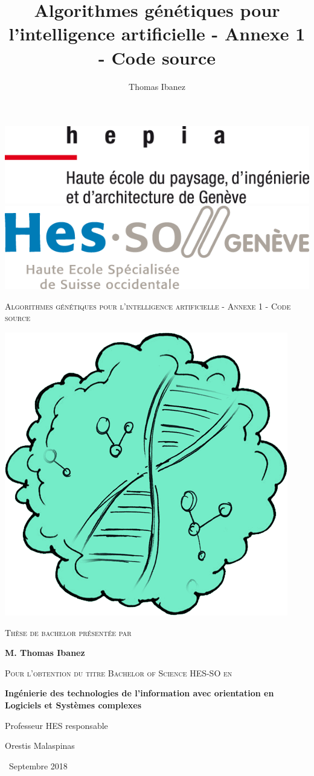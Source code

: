 \documentclass{article}
\title{Algorithmes génétiques pour l'intelligence artificielle - Annexe 1 - Code source}
\author{Thomas Ibanez}
\begin{document}
\begin{titlepage}
	\vspace*{-3cm}
		\includegraphics[width=.3\linewidth]{hepia.png}
		\hfill
		\includegraphics[width=.3\linewidth]{hes.png}\par
	\vspace{1cm}
	\centering
	{\scshape\huge Algorithmes génétiques pour l'intelligence artificielle - Annexe 1 - Code source \par}
	\vspace{1cm}
	\includegraphics[scale=0.4]{logo.png}\par
	\vspace{1.5cm}
	{\Large\scshape Thèse de bachelor présentée par\par}
	\vspace{0.5cm}
	{\bfseries\Large M. Thomas Ibanez\par}
	\vspace{0.8cm}
	{\scshape\Large Pour l'obtention du titre Bachelor of Science HES-SO en\par}
	\vspace{0.5cm}
	{\bfseries\Large Ingénierie des technologies de l'information avec orientation en Logiciels et Systèmes complexes\par}
	\vfill
	Professeur HES responsable\par
	\bfseries{Orestis Malaspinas\par}

	\vfill

	{\large\ Septembre 2018 \par}
\end{titlepage}
\end{document}
